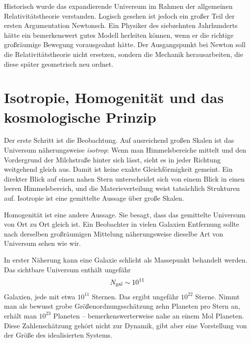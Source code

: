 Historisch wurde das expandierende Universum im Rahmen der allgemeinen Relativitätstheorie verstanden. Logisch gesehen ist jedoch ein großer Teil der ersten Argumentation Newtonsch. Ein Physiker des siebzehnten Jahrhunderts hätte ein bemerkenswert gutes Modell herleiten können, wenn er die richtige großräumige Bewegung vorausgeahnt hätte. Der Ausgangspunkt bei Newton soll die Relativitätstheorie nicht ersetzen, sondern die Mechanik herausarbeiten, die diese später geometrisch neu ordnet.

\section{Isotropie, Homogenität und das kosmologische Prinzip}

Der erste Schritt ist die Beobachtung. Auf ausreichend großen Skalen ist das Universum näherungsweise \emph{isotrop}: Wenn man Himmelsbereiche mittelt und den Vordergrund der Milchstraße hinter sich lässt, sieht es in jeder Richtung weitgehend gleich aus. Damit ist keine exakte Gleichförmigkeit gemeint. Ein direkter Blick auf einen nahen Stern unterscheidet sich von einem Blick in einen leeren Himmelsbereich, und die Materieverteilung weist tatsächlich Strukturen auf. Isotropie ist eine gemittelte Aussage über große Skalen.

Homogenität ist eine andere Aussage. Sie besagt, dass das gemittelte Universum von Ort zu Ort gleich ist. Ein Beobachter in vielen Galaxien Entfernung sollte nach derselben großräumigen Mittelung näherungsweise dieselbe Art von Universum sehen wie wir.

In erster Näherung kann eine Galaxie schlicht als Massepunkt behandelt werden. Das sichtbare Universum enthält ungefähr
\begin{equation}
N_{\rm gal}\sim 10^{11}
\end{equation}
Galaxien, jede mit etwa \(10^{11}\) Sternen. Das ergibt ungefähr \(10^{22}\) Sterne. Nimmt man als bewusst grobe Größenordnungsschätzung zehn Planeten pro Stern an, erhält man \(10^{23}\) Planeten – bemerkenswerterweise nahe an einem Mol Planeten. Diese Zahlenschätzung gehört nicht zur Dynamik, gibt aber eine Vorstellung von der Größe des idealisierten Systems.

\begin{classroomqa}
\end{classroomqa}

